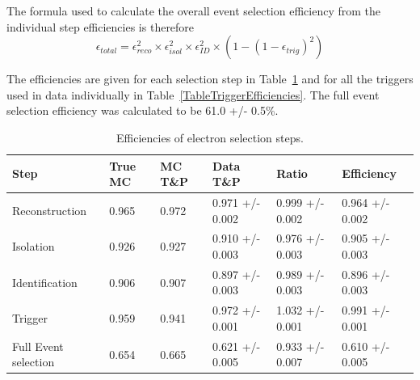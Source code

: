 
The formula used to calculate the overall event selection efficiency 
from the individual step efficiencies is therefore 
\[
\epsilon_{total} = \epsilon_{reco}^2 \times \epsilon_{isol}^2 \times \epsilon_{ID}^2 \times \left( 1 - \left( 1 - \epsilon_{trig} \right)^2 \right)
\]


The efficiencies are given for each selection step in Table~\ref{TableEfficiencies} %
and for all the triggers used in data individually in Table~\ref{TableTriggerEfficiencies}.  
The full event selection efficiency was calculated to be 
61.0 +/- 0.5\%.  

\begin{table}[htbp]
  \begin{center}
    \caption{Efficiencies of electron selection steps.}
    \label{TableEfficiencies}
    \begin{tabular}[]{ | l | l | l | l | l | l | }
      \hline
      Step & True MC & MC T\&P & Data T\&P & Ratio & Efficiency \\ \hline \hline
      Reconstruction & 0.965 & 0.972 & 0.971 +/- 0.002 & 0.999 +/- 0.002 & 0.964 +/- 0.002 \\ \hline
      Isolation & 0.926 & 0.927 & 0.910 +/- 0.003 & 0.976 +/- 0.003 & 0.905 +/- 0.003 \\ \hline
      Identification & 0.906 & 0.907 & 0.897 +/- 0.003 & 0.989 +/- 0.003 & 0.896 +/- 0.003 \\ \hline
      Trigger & 0.959 & 0.941 & 0.972 +/- 0.001 & 1.032 +/- 0.001 & 0.991 +/- 0.001 \\ \hline
      Full Event selection & 0.654 & 0.665 & 0.621 +/- 0.005 & 0.933 +/- 0.007 & 0.610 +/- 0.005 \\ \hline
    \end{tabular}
  \end{center}
\end{table}


